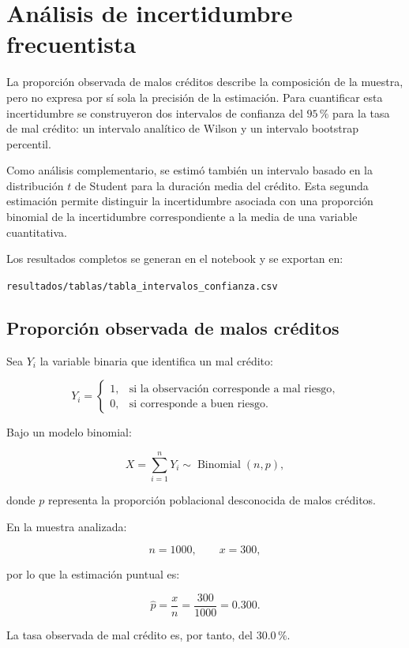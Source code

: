 \section{Análisis de incertidumbre frecuentista}
\label{sec:incertidumbre}

La proporción observada de malos créditos describe la composición de la
muestra, pero no expresa por sí sola la precisión de la estimación. Para
cuantificar esta incertidumbre se construyeron dos intervalos de confianza
del \(95\,\%\) para la tasa de mal crédito: un intervalo analítico de
Wilson y un intervalo bootstrap percentil.

Como análisis complementario, se estimó también un intervalo basado en
la distribución \(t\) de Student para la duración media del crédito. Esta
segunda estimación permite distinguir la incertidumbre asociada con una
proporción binomial de la incertidumbre correspondiente a la media de una
variable cuantitativa.

Los resultados completos se generan en el notebook y se exportan en:

\begin{center}
    \texttt{resultados/tablas/tabla\_intervalos\_confianza.csv}
\end{center}

\subsection{Proporción observada de malos créditos}

Sea \(Y_i\) la variable binaria que identifica un mal crédito:

\[
Y_i =
\begin{cases}
1, & \text{si la observación corresponde a mal riesgo},\\
0, & \text{si corresponde a buen riesgo}.
\end{cases}
\]

Bajo un modelo binomial:

\[
X=\sum_{i=1}^{n}Y_i
\sim
\operatorname{Binomial}(n,p),
\]

donde \(p\) representa la proporción poblacional desconocida de malos
créditos.

En la muestra analizada:

\[
n=1000,
\qquad
x=300,
\]

por lo que la estimación puntual es:

\[
\widehat{p}
=
\frac{x}{n}
=
\frac{300}{1000}
=
0.300.
\]

La tasa observada de mal crédito es, por tanto, del \(30.0\,\%\).


